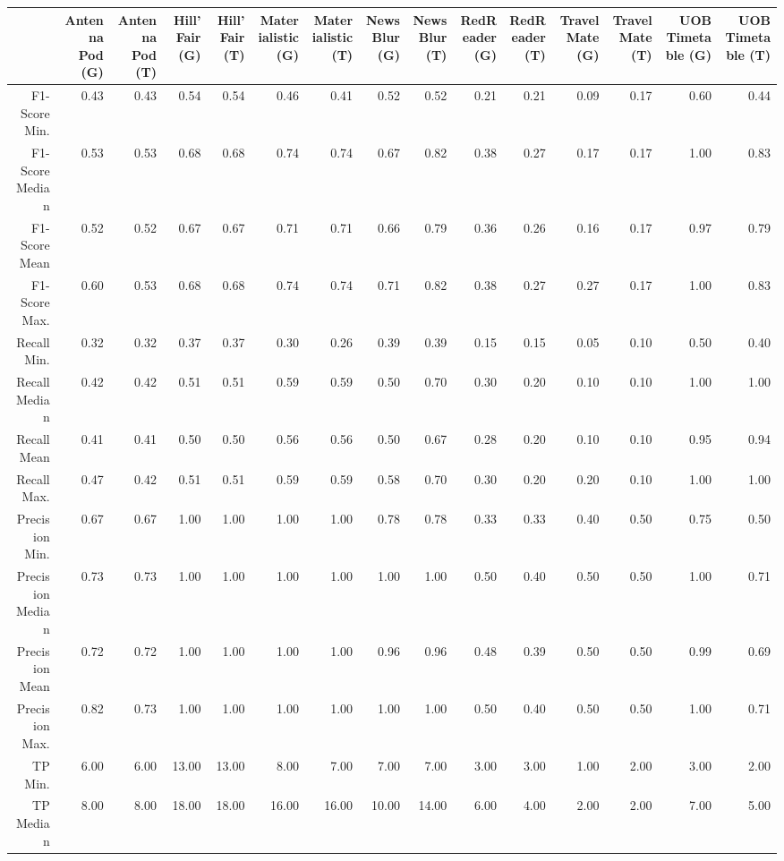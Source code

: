 \begin{table}[ht]
\centering
\begin{tabular}{rrrrrrrrrrrrrrr}
  \hline
 & Antenna Pod (G) & Antenna Pod (T) & Hill'Fair (G) & Hill'Fair (T) & Materialistic (G) & Materialistic (T) & NewsBlur (G) & NewsBlur (T) & RedReader (G) & RedReader (T) & Travel Mate (G) & Travel Mate (T) & UOB Timetable (G) & UOB Timetable (T) \\ 
  \hline
F1-Score Min. & 0.43 & 0.43 & 0.54 & 0.54 & 0.46 & 0.41 & 0.52 & 0.52 & 0.21 & 0.21 & 0.09 & 0.17 & 0.60 & 0.44 \\ 
  F1-Score Median & 0.53 & 0.53 & 0.68 & 0.68 & 0.74 & 0.74 & 0.67 & 0.82 & 0.38 & 0.27 & 0.17 & 0.17 & 1.00 & 0.83 \\ 
  F1-Score Mean & 0.52 & 0.52 & 0.67 & 0.67 & 0.71 & 0.71 & 0.66 & 0.79 & 0.36 & 0.26 & 0.16 & 0.17 & 0.97 & 0.79 \\ 
  F1-Score Max. & 0.60 & 0.53 & 0.68 & 0.68 & 0.74 & 0.74 & 0.71 & 0.82 & 0.38 & 0.27 & 0.27 & 0.17 & 1.00 & 0.83 \\ 
  Recall Min. & 0.32 & 0.32 & 0.37 & 0.37 & 0.30 & 0.26 & 0.39 & 0.39 & 0.15 & 0.15 & 0.05 & 0.10 & 0.50 & 0.40 \\ 
  Recall Median & 0.42 & 0.42 & 0.51 & 0.51 & 0.59 & 0.59 & 0.50 & 0.70 & 0.30 & 0.20 & 0.10 & 0.10 & 1.00 & 1.00 \\ 
  Recall Mean & 0.41 & 0.41 & 0.50 & 0.50 & 0.56 & 0.56 & 0.50 & 0.67 & 0.28 & 0.20 & 0.10 & 0.10 & 0.95 & 0.94 \\ 
  Recall Max. & 0.47 & 0.42 & 0.51 & 0.51 & 0.59 & 0.59 & 0.58 & 0.70 & 0.30 & 0.20 & 0.20 & 0.10 & 1.00 & 1.00 \\ 
  Precision Min. & 0.67 & 0.67 & 1.00 & 1.00 & 1.00 & 1.00 & 0.78 & 0.78 & 0.33 & 0.33 & 0.40 & 0.50 & 0.75 & 0.50 \\ 
  Precision Median & 0.73 & 0.73 & 1.00 & 1.00 & 1.00 & 1.00 & 1.00 & 1.00 & 0.50 & 0.40 & 0.50 & 0.50 & 1.00 & 0.71 \\ 
  Precision Mean & 0.72 & 0.72 & 1.00 & 1.00 & 1.00 & 1.00 & 0.96 & 0.96 & 0.48 & 0.39 & 0.50 & 0.50 & 0.99 & 0.69 \\ 
  Precision Max. & 0.82 & 0.73 & 1.00 & 1.00 & 1.00 & 1.00 & 1.00 & 1.00 & 0.50 & 0.40 & 0.50 & 0.50 & 1.00 & 0.71 \\ 
  TP Min. & 6.00 & 6.00 & 13.00 & 13.00 & 8.00 & 7.00 & 7.00 & 7.00 & 3.00 & 3.00 & 1.00 & 2.00 & 3.00 & 2.00 \\ 
  TP Median & 8.00 & 8.00 & 18.00 & 18.00 & 16.00 & 16.00 & 10.00 & 14.00 & 6.00 & 4.00 & 2.00 & 2.00 & 7.00 & 5.00 \\ 

\end{tabular}
\end{table}
